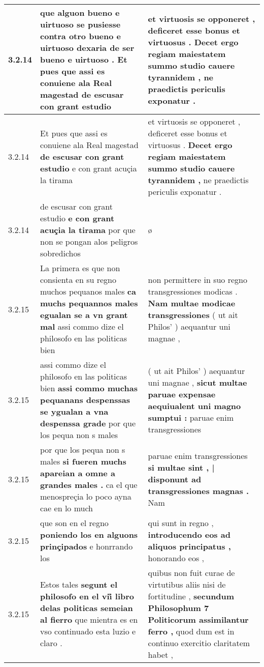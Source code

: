 \begin{tabular}{|p{1cm}|p{6.5cm}|p{6.5cm}|}
3.2.14 & que alguon bueno e uirtuoso se pusiesse contra otro bueno e uirtuoso dexaria de ser bueno e uirtuoso . \textbf{ Et pues que assi es conuiene ala Real magestad } de escusar con grant estudio & et virtuosis se opponeret , deficeret esse bonus et virtuosus . \textbf{ Decet ergo regiam maiestatem summo studio cauere tyrannidem , } ne praedictis periculis exponatur . \\\hline
3.2.14 & Et pues que assi es conuiene ala Real magestad \textbf{ de escusar con grant estudio } e con grant acuçia la tirama & et virtuosis se opponeret , deficeret esse bonus et virtuosus . \textbf{ Decet ergo regiam maiestatem summo studio cauere tyrannidem , } ne praedictis periculis exponatur . \\\hline
3.2.14 & de escusar con grant estudio \textbf{ e con grant acuçia la tirama } por que non se pongan alos peligros sobredichos & ø \\\hline
3.2.15 & La primera es que non consienta en su regno muchos pequanos males \textbf{ ca muchs pequannos males egualan se a vn grant mal } assi commo dize el philosofo en las politicas bien & non permittere in suo regno transgressiones modicas . \textbf{ Nam multae modicae transgressiones } ( ut ait Philos’ ) aequantur uni magnae , \\\hline
3.2.15 & assi commo dize el philosofo en las politicas bien \textbf{ assi commo muchas pequanans despenssas se ygualan a vna despenssa grade } por que los pequa non s males & ( ut ait Philos’ ) aequantur uni magnae , \textbf{ sicut multae paruae expensae aequiualent uni magno sumptui : } paruae enim transgressiones \\\hline
3.2.15 & por que los pequa non s males \textbf{ si fueren muchs apareian a omne a grandes males . } ca el que menospreçia lo poco ayna cae en lo much & paruae enim transgressiones \textbf{ si multae sint , | disponunt ad transgressiones magnas . } Nam \\\hline
3.2.15 & que son en el regno \textbf{ poniendo los en alguons prinçipados } e honrrando los & qui sunt in regno , \textbf{ introducendo eos ad aliquos principatus , } honorando eos , \\\hline
3.2.15 & Estos tales \textbf{ segunt el philosofo en el vii̊ libro delas politicas semeian al fierro } que mientra es en vso continuado esta luzio e claro . & quibus non fuit curae de virtutibus aliis nisi de fortitudine , \textbf{ secundum Philosophum 7 Politicorum assimilantur ferro , } quod dum est in continuo exercitio claritatem habet , \\\hline

\end{tabular}
